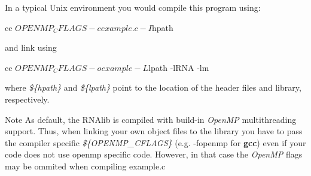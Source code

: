 In a typical Unix environment you would compile this program using\+: \begin{DoxyVerb}cc ${OPENMP_CFLAGS} -c example.c -I${hpath}
\end{DoxyVerb}
 and link using \begin{DoxyVerb}cc ${OPENMP_CFLAGS} -o example -L${lpath} -lRNA -lm
\end{DoxyVerb}
 where {\itshape \$\{hpath\}} and {\itshape \$\{lpath\}} point to the location of the header files and library, respectively. \begin{DoxyNote}{Note}
As default, the R\+N\+Alib is compiled with build-\/in {\itshape Open\+M\+P} multithreading support. Thus, when linking your own object files to the library you have to pass the compiler specific {\itshape \$\{O\+P\+E\+N\+M\+P\+\_\+\+C\+F\+L\+A\+G\+S\}} (e.\+g. \textquotesingle{}-\/fopenmp\textquotesingle{} for {\bfseries gcc}) even if your code does not use openmp specific code. However, in that case the {\itshape Open\+M\+P} flags may be ommited when compiling example.\+c 
\end{DoxyNote}
